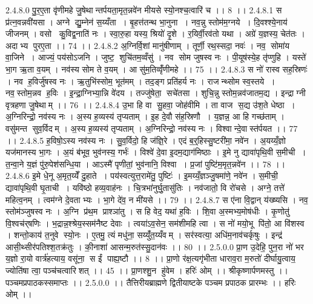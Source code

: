 2.4.8.0
पु॒र॒ए॒ता वृ॑णीमहे जु॒षेथान्तर्पयता॒मृत॒न्नवे॑न मीयसे स्यो॒नश्च॒त्वारि॑ च ।। 8 ।।
2.4.8.1
स प्र॑त्न॒वन्नवी॑यसा । अग्ने द्यु॒म्नेन॑ स॒य्यँता । बृ॒हत्त॑तन्थ भा॒नुना । नव॒न्नु स्तोम॑म॒ग्नये । दि॒वश्श्ये॒नाय॑ जीजनम् । वसो कु॒विद्व॒नाति॑ नः । स्वा॒रु॒हा यस्य॒ श्रियो॑ दृ॒शे । र॒यिर्वी॒रव॑तो यथा । अग्रे॑ य॒ज्ञस्य॒ चेत॑तः । अदाभ्य पुरए॒ता ।। 74 ।।
2.4.8.2
अ॒ग्निर्वि॒शां मानु॑षीणाम् । तूर्णी॒ रथ॒स्सदा॒ नवः॑ । नव॒॒ सोमा॑य वा॒जिने । आज्यं॒ पय॑सोऽजनि । जुष्ट॒॒ शुचि॑तम॒व्वँसु॑ । नव॑ सोम जुषस्व नः । पी॒यूष॑स्ये॒ह तृ॑प्णुहि । यस्ते॑ भा॒ग ऋ॒ता व॒यम् । नव॑स्य सोम ते व॒यम् । आ सु॑म॒तिव्वृँ॑णीमहे ।। 75 ।।
2.4.8.3
स नो॑ रास्व सह॒स्रिणः॑ । नव॑ ह॒विर्जु॑षस्व नः । ऋ॒तुभि॑स्सोम॒ भूत॑मम् । तद॒ङ्ग प्रति॑हर्य नः । राजन्थ्सोम स्व॒स्तये । नव॒॒स्तोम॒न्नव॑ ह॒विः । इ॒न्द्रा॒ग्निभ्या॒न्नि वे॑दय । तज्जु॑षेता॒॒ सचे॑तसा । शुचि॒न्नु स्तोम॒न्नव॑जातम॒द्य । इन्द्राग्नी वृत्रहणा जु॒षेथाम् ।। 76 ।।
2.4.8.4
उ॒भा हि वा॑ सु॒हवा॒ जोह॑वीमि । ता वाज॑ स॒द्य उ॑श॒ते धेष्ठा । अ॒ग्निरिन्द्रो॒ नव॑स्य नः । अ॒स्य ह॒व्यस्य॑ तृप्यताम् । इ॒ह दे॒वौ स॑ह॒स्रिणौ । य॒ज्ञन्न॒ आ हि गच्छ॑ताम् । वसु॑मन्त सुव॒र्विदम् । अ॒स्य ह॒व्यस्य॑ तृप्यताम् । अ॒ग्निरिन्द्रो॒ नव॑स्य नः । विश्वान्दे॒वास्त॑र्पयत ।। 77 ।।
2.4.8.5
ह॒विषो॒ऽस्य नव॑स्य नः । सु॒व॒र्विदो॒ हि ज॑ज्ञि॒रे । एदं ब॒र्॒हिस्सु॒ष्टरी॑मा॒ नवे॑न । अ॒यय्यँ॒ज्ञो यज॑मानस्य भा॒गः । अ॒यं ब॑भूव॒ भुव॑नस्य॒ गर्भः॑ । विश्वे॑ दे॒वा इ॒दम॒द्याग॑मिष्ठाः । इ॒मे नु द्यावा॑पृथि॒वी स॒मीची । त॒न्वा॒ने य॒ज्ञं पु॑रु॒पेश॑सन्धि॒या । आऽस्मै॑ पृणीतां॒ भुव॑नानि॒ विश्वा । प्र॒जां पुष्टि॑म॒मृत॒न्नवे॑न ।। 78 ।।
2.4.8.6
इ॒मे धे॒नू अ॒मृत॒य्येँ दु॒हाते । पय॑स्वत्युत्त॒रामे॑तु॒ पुष्टिः॑ । इ॒मय्यँ॒ज्ञञ्जु॒षमा॑णे॒ नवे॑न । स॒मीची॒ द्यावा॑पृथि॒वी घृ॒ताची । यवि॑ष्ठो हव्य॒वाह॑नः । चि॒त्रभा॑नुर्घु॒तासु॑तिः । नव॑जातो॒ वि रो॑चसे । अग्ने॒ तत्ते॑ महित्व॒नम् । त्वम॑ग्ने दे॒वताभ्यः । भा॒गे दे॑व॒ न मी॑यसे ।। 79 ।।
2.4.8.7
स ए॑ना वि॒द्वान् य॑ख्ष्यसि । नव॒॒ स्तोम॑ञ्जुषस्व नः । अ॒ग्नि प्र॑थ॒म प्राश्ञा॑तु । स हि वेद॒ यथा॑ ह॒विः । शि॒वा अ॒स्मभ्य॒मोष॑धीः । कृ॒णोतु॑ वि॒श्वच॑र्‌षणिः । भ॒द्रान्न॒श्श्रेय॒स्सम॑नैष्ट देवाः । त्वया॑ऽव॒सेन॒ सम॑शीमहि त्वा । स नो॑ मयो॒भू पि॑तो॒ आ वि॑शस्व । शन्तो॒काय॑ त॒नुवे स्यो॒नः । ए॒तमु॒ त्यं मधु॑ना॒ सय्युँ॑त॒य्यँवम् । सर॑स्वत्या॒ अधि॑म॒नाव॑चर्कृषुः । इन्द्र॑ आसी॒थ्सीर॑पतिश्श॒तक्र॑तुः । की॒नाशा॑ आसन्म॒रुत॑स्सु॒दान॑वः ।। 80 ।।
2.5.0.0
प्रा॒ण उ॒देहि॒ पुन॒रा नो॑ भर य॒ज्ञो रा॒यो वार्त्र॑हत्याय॒ वसू॑ना॒॒ स ईं पाह्य॒ष्टौ ।। 8 ।। प्रा॒णो र॑क्ष॒त्यगृ॑भीता धाराव॒रा म॒रुतो॑ दीर्घायु॒त्वाय॒ ज्योति॑षा त्वा॒ पञ्च॑चत्वारिशत् ।। 45 ।। प्रा॒णश्शु॒न हु॑वेम । हरिः॑ ओम् ।। श्रीकृष्णार्पणमस्तु ।। पञ्चमप्रपाठकस्समाप्तः ।।
2.5.0.0
।। तैत्तिरीयब्राह्मणे द्वितीयाष्टके पञ्चम प्रपाठक प्रारम्भः ।। हरिः ओम् ।।
